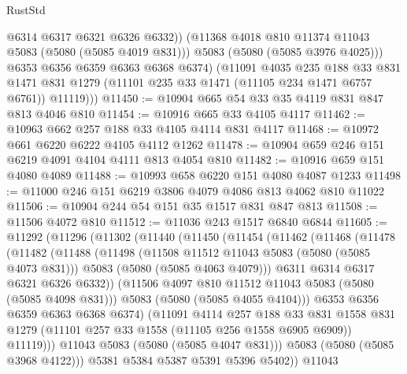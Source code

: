 \begin{lexlean}{RustStd}
\begin{coremodule}
                @6314
                @6317
                @6321
                @6326
                @6332))
            (@11368 @4018 @810 @11374 @11043 @5083 (@5080 (@5085 @4019 @831)))
            @5083
            (@5080 (@5085 @3976 @4025)))
          @6353
          @6356
          @6359
          @6363
          @6368
          @6374)
        (@11091
          @4035
          @235
          @188
          @33
          @831
          @1471
          @831
          @1279
          (@11101 @235 @33 @1471 (@11105 @234 @1471 @6757 @6761))
          @11119)))
@11450 := @10904 @665 @54 @33 @35 @4119 @831 @847 @813 @4046 @810
@11454 := @10916 @665 @33 @4105 @4117
@11462 := @10963 @662 @257 @188 @33 @4105 @4114 @831 @4117
@11468 := @10972 @661 @6220 @6222 @4105 @4112 @1262
@11478 := @10904 @659 @246 @151 @6219 @4091 @4104 @4111 @813 @4054 @810
@11482 := @10916 @659 @151 @4080 @4089
@11488 := @10993 @658 @6220 @151 @4080 @4087 @1233
@11498 := @11000 @246 @151 @6219 @3806 @4079 @4086 @813 @4062 @810 @11022
@11506 := @10904 @244 @54 @151 @35 @1517 @831 @847 @813
@11508 := @11506 @4072 @810
@11512 := @11036 @243 @1517 @6840 @6844
@11605 := @11292
    (@11296
      (@11302
        (@11440
          (@11450
            (@11454
              (@11462
                (@11468
                  (@11478
                    (@11482
                      (@11488
                        (@11498
                          (@11508 @11512 @11043 @5083 (@5080 (@5085 @4073 @831)))
                          @5083
                          (@5080 (@5085 @4063 @4079)))
                        @6311
                        @6314
                        @6317
                        @6321
                        @6326
                        @6332))
                    (@11506 @4097 @810 @11512 @11043 @5083 (@5080 (@5085 @4098 @831)))
                    @5083
                    (@5080 (@5085 @4055 @4104)))
                  @6353
                  @6356
                  @6359
                  @6363
                  @6368
                  @6374)
                (@11091
                  @4114
                  @257
                  @188
                  @33
                  @831
                  @1558
                  @831
                  @1279
                  (@11101 @257 @33 @1558 (@11105 @256 @1558 @6905 @6909))
                  @11119)))
            @11043
            @5083
            (@5080 (@5085 @4047 @831)))
          @5083
          (@5080 (@5085 @3968 @4122)))
        @5381
        @5384
        @5387
        @5391
        @5396
        @5402))
    @11043

\end{coremodule}
\end{lexlean}
